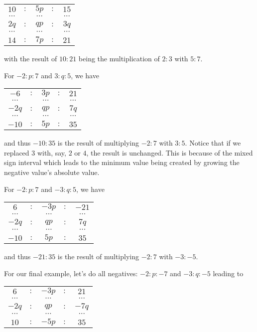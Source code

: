 \documentclass[12pt]{article}
\begin{document}
\begin{enumerate}
     \begin{tabular}{ccccc}
        $10$ &$:$& $5p$ &$:$& $15$ \\
        $\cdots$ & & $\cdots$ & & $\cdots$ \\
        $2q$ &$:$& $qp$ &$:$& $3q$\\
        $\cdots$ & & $\cdots$ & & $\cdots$ \\
         $14$ &$:$& $7p$&$:$& $21$
    \end{tabular}
    
    with the result of $10:21$ being the multiplication of $2:3$ with $5:7$.
    
    For $-2 : p : 7$ and $3: q : 5$, we have
    
     \begin{tabular}{ccccc}
        $-6$ &$:$& $3p$ &$:$& $21$ \\
        $\cdots$ & & $\cdots$ & & $\cdots$ \\
        $-2q$ &$:$& $qp$ &$:$& $7q$\\
        $\cdots$ & & $\cdots$ & & $\cdots$ \\
         $-10$ &$:$& $5p$&$:$& $35$
    \end{tabular}
    
    and thus $-10:35$ is the result of multiplying $-2:7$ with $3:5$. Notice that if we replaced $3$ with, say, $2$ or $4$, the result is unchanged. This is because of the mixed sign interval which leads to the minimum value being created by growing the negative value's absolute value. 

     For $-2 : p : 7$ and $-3: q : 5$, we have
    
     \begin{tabular}{ccccc}
        $6$ &$:$& $-3p$ &$:$& $-21$ \\
        $\cdots$ & & $\cdots$ & & $\cdots$ \\
        $-2q$ &$:$& $qp$ &$:$& $7q$\\
        $\cdots$ & & $\cdots$ & & $\cdots$ \\
         $-10$ &$:$& $5p$&$:$& $35$
    \end{tabular}
    
    and thus $-21:35$ is the result of multiplying $-2:7$ with $-3:-5$.

    For our final example, let's do all negatives: $-2 : p : -7$ and $-3: q : -5$ leading to
    
     \begin{tabular}{ccccc}
        $6$ &$:$& $-3p$ &$:$& $21$ \\
        $\cdots$ & & $\cdots$ & & $\cdots$ \\
        $-2q$ &$:$& $qp$ &$:$& $-7q$\\
        $\cdots$ & & $\cdots$ & & $\cdots$ \\
         $10$ &$:$& $-5p$&$:$& $35$
    \end{tabular}
    

\end{enumerate}
\end{document}
